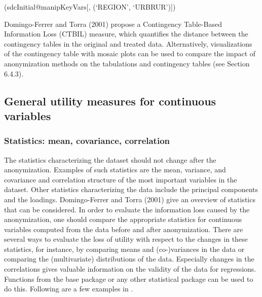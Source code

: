 \documentclass[letterpaper,10pt,english]{sphinxmanual}
\begin{document}
(sdcInitial@manipKeyVars{[}, (‘REGION’, ‘URBRUR’){]}) 

\begin{DUlineblock}{0em}
\item[] 
\item[] 
\item[] 
\item[] 
\item[] 
\item[] 
\item[] 
\item[] 
\end{DUlineblock}

Domingo-Ferrer and Torra (2001) propose a Contingency Table-Based
Information Loss (CTBIL) measure, which quantifies the distance between
the contingency tables in the original and treated data. Alternatively,
visualizations of the contingency table with mosaic plots can be used to
compare the impact of anonymization methods on the tabulations and
contingency tables (see Section 6.4.3).


\subsection{General utility measures for continuous variables}
\label{\detokenize{utility:general-utility-measures-for-continuous-variables}}

\subsubsection{Statistics: mean, covariance, correlation}
\label{\detokenize{utility:statistics-mean-covariance-correlation}}
The statistics characterizing the dataset should not change after the
anonymization. Examples of such statistics are the mean, variance, and
covariance and correlation structure of the most important variables in
the dataset. Other statistics characterizing the data include the
principal components and the loadings. Domingo-Ferrer and Torra (2001)
give an overview of statistics that can be considered. In order to
evaluate the information loss caused by the anonymization, one should
compare the appropriate statistics for continuous variables computed
from the data before and after anonymization. There are several ways to
evaluate the loss of utility with respect to the changes in these
statistics, for instance, by comparing means and (co-)variances in the
data or comparing the (multivariate) distributions of the data.
Especially changes in the correlations gives valuable information on the
validity of the data for regressions. Functions from the  base
package or any other statistical package can be used to do this.
Following are a few examples in .
\end{document}
